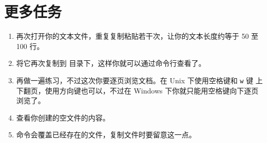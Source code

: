 \section{更多任务}

\begin{enumerate}
\item 再次打开你的文本文件，重复复制粘贴若干次，让你的文本长度约等于 50 至 100 
    行。
\item 将它再次复制到  目录下，这样你就可以通过命令行查看了。
\item 再做一遍练习，不过这次你要逐页浏览文档。在 Unix 下使用空格键和 \verb|w| 键
    上下翻页，使用方向键也可以，不过在 Windows 下你就只能用空格键向下逐页浏览了。
\item 查看你创建的空文件的内容。
\item {} 命令会覆盖已经存在的文件，复制文件时要留意这一点。
\end{enumerate}

